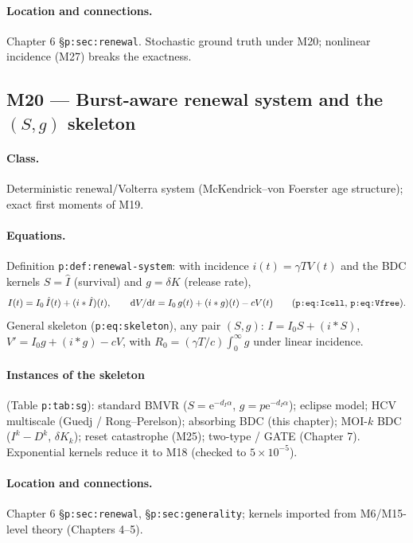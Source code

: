 \documentclass[11pt,a4paper]{article}
\newcommand{\ee}{\mathrm{e}}
\newcommand{\dd}{\mathrm{d}}
\begin{document}
\paragraph{Location and connections.} Chapter 6
\S\texttt{p:sec:renewal}. Stochastic ground truth under M20; nonlinear
incidence (M27) breaks the exactness.

\subsection{M20 --- Burst-aware renewal system and the $(S,g)$ skeleton
}

\paragraph{Class.} Deterministic renewal/Volterra system
(McKendrick--von Foerster age structure); exact first moments of M19.

\paragraph{Equations.} Definition \texttt{p:def:renewal-system}: with
incidence $i(t)=\gamma TV(t)$ and the BDC kernels
$S=\hat I$ (survival) and $g=\delta K$ (release rate),
\[
I(t)=I_0\,\hat I(t)+(i*\hat I)(t),
\qquad
\dd V/\dd t=I_0\,g(t)+(i*g)(t)-cV(t)
\qquad\text{(\texttt{p:eq:Icell}, \texttt{p:eq:Vfree})}.
\]
General skeleton (\texttt{p:eq:skeleton}), any pair $(S,g)$:
$I=I_0S+(i*S)$, $V'=I_0g+(i*g)-cV$, with
$R_0=(\gamma T/c)\int_0^\infty g$ under linear incidence.

\paragraph{Instances of the skeleton} (Table \texttt{p:tab:sg}): standard
BMVR ($S=\ee^{-d_I\alpha}$, $g=p\ee^{-d_I\alpha}$); eclipse model;
HCV multiscale (Guedj / Rong--Perelson); absorbing BDC (this chapter);
MOI-$k$ BDC ($I^k-D^k$, $\delta K_k$); reset catastrophe (M25); two-type /
GATE (Chapter 7). Exponential kernels reduce it to M18 (checked to
$5\times10^{-5}$).

\paragraph{Location and connections.} Chapter 6
\S\texttt{p:sec:renewal}, \S\texttt{p:sec:generality}; kernels imported
from M6/M15-level theory (Chapters 4--5).
\end{document}
